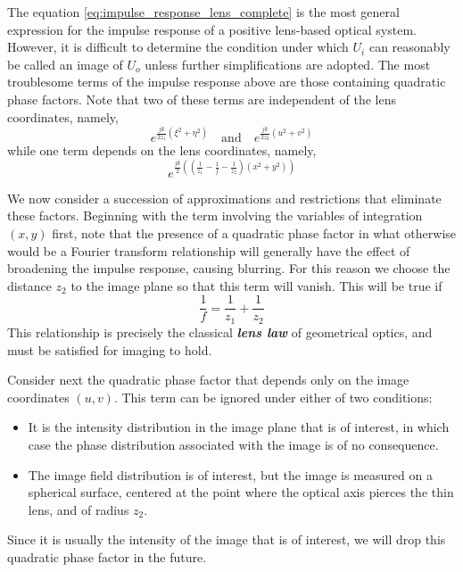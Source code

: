\documentclass{article}
\begin{document}
The equation \ref{eq:impulse_response_lens_complete} is the most general expression for the impulse response of a positive lens-based optical system.
However, it is difficult to determine the condition under which $U_i$ can reasonably be called an image of $U_o$ unless further simplifications are adopted. 
The most troublesome terms of the impulse response above are those containing quadratic phase factors. Note that two of these terms are independent of the lens coordinates, namely,
\begin{equation}
    e^{\frac{jk}{2z_1}(\xi^2 + \eta^2)} \quad \text{and} \quad e^{\frac{jk}{2z_2}(u^2 + v^2)}
\end{equation}
while one term depends on the lens coordinates, namely,
\begin{equation}
    e^{\frac{jk}{2}\left(\left(\frac{1}{z_1} - \frac{1}{f} - \frac{1}{z_2}\right)(x^2 + y^2) \right)}
\end{equation}

We now consider a succession of approximations and restrictions that eliminate
these factors.
Beginning with the term involving the variables of integration $(x, y)$ first, note that the presence of a quadratic phase factor in what otherwise would be a Fourier transform relationship will generally have the effect of broadening the impulse response, causing blurring. 
For this reason we choose the distance $z_2$ to the image plane so that this term will vanish. 
This will be true if
\begin{equation}
    \frac{1}{f} = \frac{1}{z_1} + \frac{1}{z_2}
\end{equation}
This relationship is precisely the classical \textbf{\textit{lens law}} of geometrical optics, and must be satisfied for imaging to hold.

Consider next the quadratic phase factor that depends only  on the image coordinates $(u,v)$. This term can be ignored under either of two conditions:
\begin{itemize}
    \item It is the intensity distribution in the image plane that is of interest, in which case the phase distribution associated with the image is of no consequence.
    \item The image field distribution is of interest, but the image is measured on a spherical surface, centered at the point where the optical axis pierces the thin lens, and of radius $z_2$.
\end{itemize}
Since it is usually the intensity of the image that is of interest, we will drop this quadratic phase factor in the future.
\end{document}
